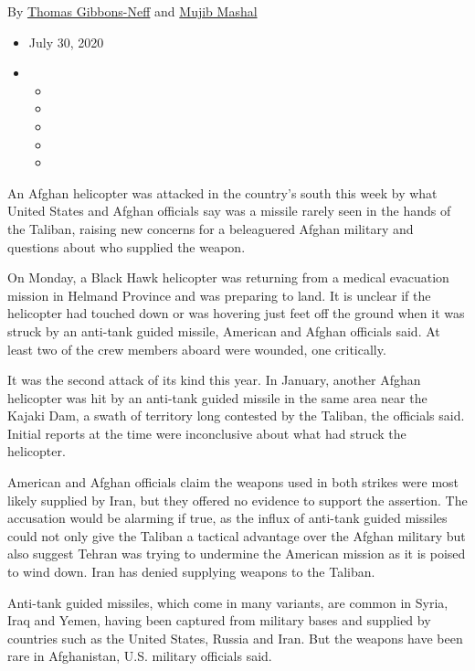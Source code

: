 By
\href{https://www.nytimes3xbfgragh.onion/by/thomas-gibbons-neff}{Thomas
Gibbons-Neff} and
\href{https://www.nytimes3xbfgragh.onion/by/mujib-mashal}{Mujib Mashal}

\begin{itemize}
\item
  July 30, 2020
\item
  \begin{itemize}
  \item
  \item
  \item
  \item
  \item
  \end{itemize}
\end{itemize}

An Afghan helicopter was attacked in the country's south this week by
what United States and Afghan officials say was a missile rarely seen in
the hands of the Taliban, raising new concerns for a beleaguered Afghan
military and questions about who supplied the weapon.

On Monday, a Black Hawk helicopter was returning from a medical
evacuation mission in Helmand Province and was preparing to land. It is
unclear if the helicopter had touched down or was hovering just feet off
the ground when it was struck by an anti-tank guided missile, American
and Afghan officials said. At least two of the crew members aboard were
wounded, one critically.

It was the second attack of its kind this year. In January, another
Afghan helicopter was hit by an anti-tank guided missile in the same
area near the Kajaki Dam, a swath of territory long contested by the
Taliban, the officials said. Initial reports at the time were
inconclusive about what had struck the helicopter.

American and Afghan officials claim the weapons used in both strikes
were most likely supplied by Iran, but they offered no evidence to
support the assertion. The accusation would be alarming if true, as the
influx of anti-tank guided missiles could not only give the Taliban a
tactical advantage over the Afghan military but also suggest Tehran was
trying to undermine the American mission as it is poised to wind down.
Iran has denied supplying weapons to the Taliban.

Anti-tank guided missiles, which come in many variants, are common in
Syria, Iraq and Yemen, having been captured from military bases and
supplied by countries such as the United States, Russia and Iran. But
the weapons have been rare in Afghanistan, U.S. military officials said.


